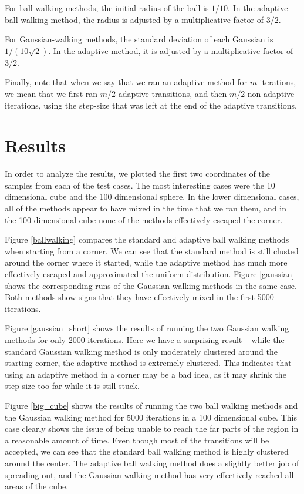 \documentclass[11pt]{article}
\begin{document}
For ball-walking methods, the initial radius of the ball is $1/10$. In the adaptive ball-walking method, the radius is adjusted by a multiplicative factor of $3/2$.

For Gaussian-walking methods, the standard deviation of each Gaussian is $1/(10\sqrt{2})$. In the adaptive method, it is adjusted by a multiplicative factor of $3/2$.

Finally, note that when we say that we ran an adaptive method for $m$ iterations, we mean that we first ran $m/2$ adaptive transitions, and then $m/2$ non-adaptive iterations, using the step-size that was left at the end of the adaptive transitions.

\section{Results}\label{results}

In order to analyze the results, we plotted the first two coordinates of the samples from each of the test cases. The most interesting cases were the 10 dimensional cube and the 100 dimensional sphere. In the lower dimensional cases, all of the methods appear to have mixed in the time that we ran them, and in the 100 dimensional cube none of the methods effectively escaped the corner.

Figure \ref{ballwalking} compares the standard and adaptive ball walking methods when starting from a corner. We can see that the standard method is still clusted around the corner where it started, while the adaptive method has much more effectively escaped and approximated the uniform distribution.
Figure \ref{gaussian} shows the corresponding runs of the Gaussian walking methods in the same case. Both methods show signs that they have effectively mixed in the first 5000 iterations.

Figure \ref{gaussian_short} shows the results of running the two Gaussian walking methods for only 2000 iterations. Here we have a surprising result -- while the standard Gaussian walking method is only moderately clustered around the starting corner, the adaptive method is extremely clustered. This indicates that using an adaptive method in a corner may be a bad idea, as it may shrink the step size too far while it is still stuck.

Figure \ref{big_cube} shows the results of running the two ball walking methods and the Gaussian walking method for 5000 iterations in a 100 dimensional cube. This case clearly shows the issue of being unable to reach the far parts of the region in a reasonable amount of time. Even though most of the transitions will be accepted, we can see that the standard ball walking method is highly clustered around the center. The adaptive ball walking method does a slightly better job of spreading out, and the Gaussian walking method has very effectively reached all areas of the cube.
\end{document}
